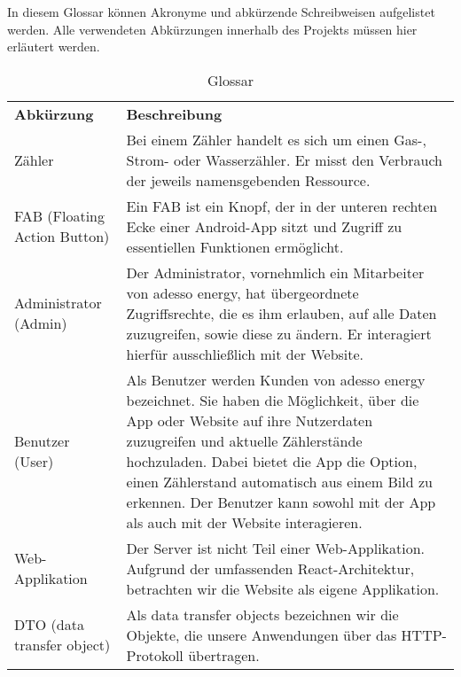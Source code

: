 \begin{tcolorbox}
In diesem Glossar können Akronyme und abkürzende Schreibweisen aufgelistet werden. 
Alle verwendeten Abkürzungen innerhalb des Projekts müssen hier erläutert werden.
\end{tcolorbox}

\begin{table}[h]
	\centering
	\begin{tabularx}{\textwidth}{X X}
		\rowcolor[HTML]{C0C0C0} 
		\textbf{Abkürzung} & \textbf{Beschreibung} \\
		Zähler & Bei einem Zähler handelt es sich um einen Gas-, Strom- oder Wasserzähler. Er misst den Verbrauch der jeweils namensgebenden Ressource. \\
		\rowcolor[HTML]{E7E7E7} 
		FAB (Floating Action Button) & Ein FAB ist ein Knopf, der in der unteren rechten Ecke einer Android-App sitzt und Zugriff zu essentiellen Funktionen ermöglicht. \\
		Administrator (Admin) & Der Administrator, vornehmlich ein Mitarbeiter von adesso energy, hat übergeordnete Zugriffsrechte, die es ihm erlauben, auf alle Daten zuzugreifen, sowie diese zu ändern. Er interagiert hierfür ausschließlich mit der Website. \\
		\rowcolor[HTML]{E7E7E7} 
		Benutzer (User) & Als Benutzer werden Kunden von adesso energy bezeichnet. Sie haben die Möglichkeit, über die App oder Website auf ihre Nutzerdaten zuzugreifen und aktuelle Zählerstände hochzuladen. Dabei bietet die App die Option, einen Zählerstand automatisch aus einem Bild zu erkennen. Der Benutzer kann sowohl mit der App als auch mit der Website interagieren. \\
		Web-Applikation & Der Server ist nicht Teil einer Web-Applikation. Aufgrund der umfassenden React-Architektur, betrachten wir die Website als eigene Applikation. \\
		\rowcolor[HTML]{E7E7E7} 
		DTO (data transfer object) & Als data transfer objects bezeichnen wir die Objekte, die unsere Anwendungen über das HTTP-Protokoll übertragen.
	\end{tabularx}
	\caption{Glossar}
	\label{table:glossar}
\end{table}